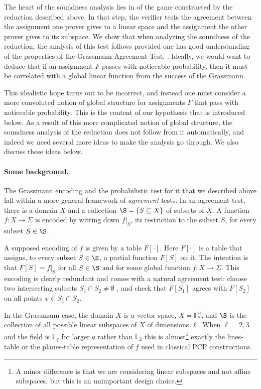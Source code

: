\documentclass{toc}
\newcommand\set[1]{{\left\{ #1 \right\}}}
\renewcommand\subset{\subseteq}
\def\F{\mathbb{F}}
\begin{document}
The heart of the soundness analysis lies in  of the game constructed by the reduction described above.
In that step, the verifier tests the agreement between the assignment one prover gives to a linear space and the assignment the
other prover gives to its subspace. We show that when analyzing the soundness of the reduction, the analysis of this test follows
provided one has good understanding of the properties of the Grassmann Agreement Test, .
Ideally, we would want to deduce that if an assignment $F$ passes
%
with noticeable probability, then
it must be correlated with a global linear function from the success of the Grassmann.

This idealistic hope turns out to be
incorrect, and instead one must consider a more convoluted notion of global structure for assignments $F$ that pass
%
with noticeable probability. This is the content of our hypothesis that is introduced below. As a result
of this more complicated notion of global structure, the soundness analysis of the reduction does not follow from it automatically,
and indeed we need several more ideas to make the analysis go through. We also discuss these ideas below.



\paragraph{Some background.} The Grassmann encoding and the probabilistic test for it that
we described above fall within a more general framework of {\em
  agreement} tests.  In an agreement test, there is a domain $X$ and a
collection $\S = \set {S\subset X}$ of subsets of $X$. A function
$f:X\to\Sigma$ is encoded by writing down $f|_S$, its restriction to
the subset $S$, for every subset $S\in \S$.

A supposed encoding of $f$ is given by a table $F[\cdot]$. Here $F[\cdot]$ is a table that assigns, to every subset ${S\in\S}$, a partial function $F[S]$ on it. The intention is that $F[S] = f|_S$ for all $S\in \S$ and for some global function $f:X\to\Sigma$.
This encoding is clearly redundant and comes with a natural agreement test: choose two intersecting subsets $S_1\cap S_2\neq \emptyset$
%
, and check that $F[S_1]$ agrees with $F[S_2]$ on all points $x\in S_1\cap S_2$.

 In the Grassmann case, the domain $X$ is a vector space, $X=\F_2^n$, and $\S$ is
the collection of all possible linear subspaces of $X$ of dimensions
$\ell$. When $\ell=2,3$ and the field is $\F_q$ for larger $q$ rather than $\F_2$ this is almost\footnote{A minor difference is that we are considering linear subspaces and not affine subspaces, but this is an unimportant design choice.} exactly the lines-table or the planes-table representation of $f$ used in classical PCP constructions.
\end{document}
